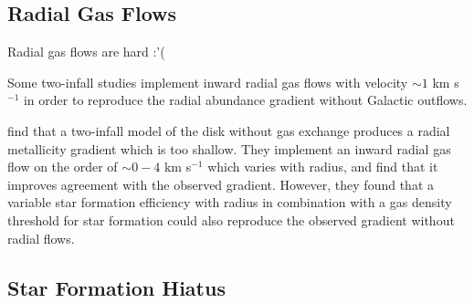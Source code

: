 \documentclass[twocolumn,twocolappendix,linenumbers]{aastex631}
\newcommand{\todo}[1]{{\color{red}#1}}
\begin{document}

\subsection{Radial Gas Flows}
\label{sec:radial-flows}

\todo{Radial gas flows are hard :'(}

Some two-infall studies \citep[e.g.,][]{spitoni_effects_2011,palla_chemical_2020,palla_mapping_2024} implement inward radial gas flows with velocity $\sim1$ km s$^{-1}$ in order to reproduce the radial abundance gradient without Galactic outflows.

\citet{spitoni_effects_2011} find that a two-infall model of the disk without gas exchange produces a radial metallicity gradient which is too shallow. They implement an inward radial gas flow on the order of $\sim0-4$ km s$^{-1}$ which varies with radius, and find that it improves agreement with the observed gradient. However, they found that a variable star formation efficiency with radius in combination with a gas density threshold for star formation could also reproduce the observed gradient without radial flows.

\subsection{Star Formation Hiatus}
\label{sec:sfe-hiatus}
\end{document}
